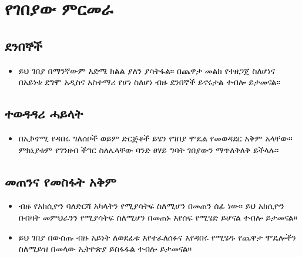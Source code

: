 \documentclass[a4paper,12pt]{article}
\newenvironment{geez}{\geezfont}{}
\begin{document}
\section{\begin{geez}የገበያው ምርመራ\end{geez}}
\subsection{\begin{geez}ደንበኞች\end{geez}}
\begin{itemize}
\item ይህ ገበያ በማንኛውም እድሜ ክልል ያለን ያሳትፋል። በጨዋታ መልክ የተዘጋጀ ስለሆነና በአይነቱ ደግሞ አዲስና አስተማሪ የሆነ ስለሆነ ብዙ ደንበኞች ይኖሩታል ተብሎ ይታመናል። 
\end{itemize}
\subsection{\begin{geez}ተወዳዳሪ ሓይላት\end{geez}}
\begin{itemize}
\item በኢኮኖሚ የዳበሩ ግለሰቦች ወይም ድርጅቶች ይሄን የገበያ ሞዴል የመወዳደር አቅም አላቸው። ምክኒያቱም የገንዘብ ችግር ስለሌላቸው ባንድ ፀሃይ ግባት ገበያውን ማጥለቅለቅ ይችላሉ።  
\end{itemize}
\subsection{\begin{geez}መጠንና የመስፋት አቅም\end{geez}}
\begin{itemize}
\item ብዙ የአክሲዮን ባለድርሻ አካላትን የሚያሳትፍ ስለሚሆን በመጠን ሰፊ ነው። ይህ አክሲዮን በብዛት መምህራንን የሚያሳትፍ ስለሚሆን በመጠኑ እየሰፍ የሚሄድ ይሆናል ተብሎ ይታመናል።
\item ይህ ገበያ በውስጡ ብዙ አይነት ለወደፊቱ እየተፈለሰፉና እየዳበሩ የሚሄዱ የጨዋታ ሞዴሎችን ስለሚይዝ በመላው ኢትዮጵያ ይስፋፋል ተብሎ ይታመናል።
\end{itemize}
\end{document}
